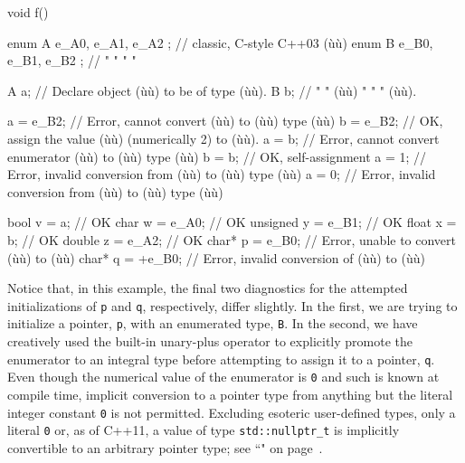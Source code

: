 \begin{emcppslisting}
void f()
{
    enum A { e_A0, e_A1, e_A2 };  // classic, C-style C++03 (ù{}ù)
    enum B { e_B0, e_B1, e_B2 };  //    "       "       "     "

    A a;  // Declare object (ù{}ù) to be of type (ù{}ù).
    B b;  //   "       "    (ù{}ù)  " "  "       (ù{}ù).

    a = e_B2;  // Error, cannot convert (ù{}ù) to (ù{}ù) type (ù{}ù)
    b = e_B2;  // OK, assign the value (ù{}ù) (numerically 2) to (ù{}ù).
    a = b;     // Error, cannot convert enumerator (ù{}ù) to (ù{}ù) type (ù{}ù)
    b = b;     // OK, self-assignment
    a = 1;     // Error, invalid conversion from (ù{}ù) to (ù{}ù) type (ù{}ù)
    a = 0;     // Error, invalid conversion from (ù{}ù) to (ù{}ù) type (ù{}ù)

    bool     v = a;     // OK
    char     w = e_A0;  // OK
    unsigned y = e_B1;  // OK
    float    x = b;     // OK
    double   z = e_A2;  // OK
    char*    p = e_B0;  // Error, unable to convert (ù{}ù) to (ù{}ù)
    char*    q = +e_B0; // Error, invalid conversion of (ù{}ù) to (ù{}ù)
}
\end{emcppslisting}

\noindent Notice that, in this example, the final two diagnostics for the
attempted initializations of \texttt{p} and \texttt{q}, respectively,
differ slightly. In the first, we are trying to initialize a pointer,
\texttt{p}, with an enumerated type, \texttt{B}. In the second, we have
creatively used the built-in unary-plus operator to explicitly promote
the enumerator to an integral type before attempting to assign it to a
pointer, \texttt{q}. Even though the numerical value of the enumerator
is \texttt{0} and such is known at compile time, implicit
conversion to a pointer type from anything but the literal integer
constant \texttt{0} is not
permitted. Excluding esoteric user-defined
types, only a literal \texttt{0} or, as of C++11, a value of type
\texttt{std::nullptr\_t} is implicitly convertible to an arbitrary
  pointer type; see ``" on page~\pageref{null-pointer-literal-(nullptr)}.

